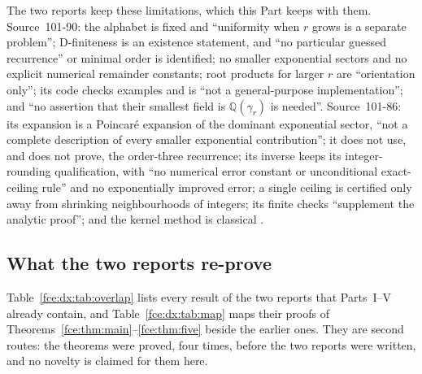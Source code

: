 \documentclass[11pt,a4paper]{article}
\numberwithin{equation}{section}
\theoremstyle{definition}\newtheorem{definition}[theorem]{Definition}
\theoremstyle{remark}\newtheorem{remark}[theorem]{Remark}
\newcommand{\Q}{\mathbb Q}
\begin{document}
The two reports keep these limitations, which this Part keeps with them.
Source~101-90: the alphabet is fixed and ``uniformity when $r$ grows is a
separate problem''; D-finiteness is an existence statement, and ``no
particular guessed recurrence'' or minimal order is identified; no smaller
exponential sectors and no explicit numerical remainder constants; root
products for larger $r$ are ``orientation only''; its code checks examples
and is ``not a general-purpose implementation''; and ``no assertion that
their smallest field is $\Q(\gamma_r)$ is needed''. Source~101-86: its
expansion is a Poincar\'e expansion of the dominant exponential sector,
``not a complete description of every smaller exponential contribution'';
it does not use, and does not prove, the order-three recurrence; its inverse
keeps its integer-rounding qualification, with ``no numerical error constant
or unconditional exact-ceiling rule'' and no exponentially improved error;
a single ceiling is certified only away from shrinking neighbourhoods of
integers; its finite checks ``supplement the analytic proof''; and the
kernel method is classical \cite{bf}.

\subsection{What the two reports re-prove}\label{fce:dx:sec:overlap}
Table~\ref{fce:dx:tab:overlap} lists every result of the two reports that
Parts~I--V already contain, and Table~\ref{fce:dx:tab:map} maps their proofs
of Theorems~\ref{fce:thm:main}--\ref{fce:thm:five} beside the earlier ones.
They are second routes: the theorems were proved, four times, before the two
reports were written, and no novelty is claimed for them here.
\end{document}
